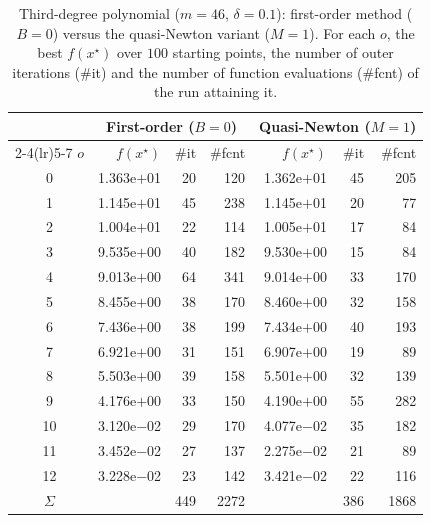 
\begin{table}[t]
  \centering
  \begin{tabular}{c rrr rrr}
    \toprule
      & \multicolumn{3}{c}{First-order ($B=0$)}
      & \multicolumn{3}{c}{Quasi-Newton ($M=1$)} \\
    \cmidrule(lr){2-4}\cmidrule(lr){5-7}
    $o$ & $f(x^\star)$ & \#it & \#fcnt & $f(x^\star)$ & \#it & \#fcnt \\
    \midrule
     0 & 1.363e$+$01 & 20 & 120 & 1.362e$+$01 & 45 & 205 \\
     1 & 1.145e$+$01 & 45 & 238 & 1.145e$+$01 & 20 &  77 \\
     2 & 1.004e$+$01 & 22 & 114 & 1.005e$+$01 & 17 &  84 \\
     3 & 9.535e$+$00 & 40 & 182 & 9.530e$+$00 & 15 &  84 \\
     4 & 9.013e$+$00 & 64 & 341 & 9.014e$+$00 & 33 & 170 \\
     5 & 8.455e$+$00 & 38 & 170 & 8.460e$+$00 & 32 & 158 \\
     6 & 7.436e$+$00 & 38 & 199 & 7.434e$+$00 & 40 & 193 \\
     7 & 6.921e$+$00 & 31 & 151 & 6.907e$+$00 & 19 &  89 \\
     8 & 5.503e$+$00 & 39 & 158 & 5.501e$+$00 & 32 & 139 \\
     9 & 4.176e$+$00 & 33 & 150 & 4.190e$+$00 & 55 & 282 \\
    10 & 3.120e$-$02 & 29 & 170 & 4.077e$-$02 & 35 & 182 \\
    11 & 3.452e$-$02 & 27 & 137 & 2.275e$-$02 & 21 &  89 \\
    12 & 3.228e$-$02 & 23 & 142 & 3.421e$-$02 & 22 & 116 \\
    \midrule
    $\Sigma$ & & 449 & 2272 & & 386 & 1868 \\
    \bottomrule
  \end{tabular}
  \caption{Third-degree polynomial ($m=46$, $\delta=0.1$): first-order method
  ($B=0$) versus the quasi-Newton variant ($M=1$). For each $o$, the best
  $f(x^\star)$ over $100$ starting points, the number of outer iterations
  (\#it) and the number of function evaluations (\#fcnt) of the run attaining
  it.}
  \label{tab:poly}
\end{table}

